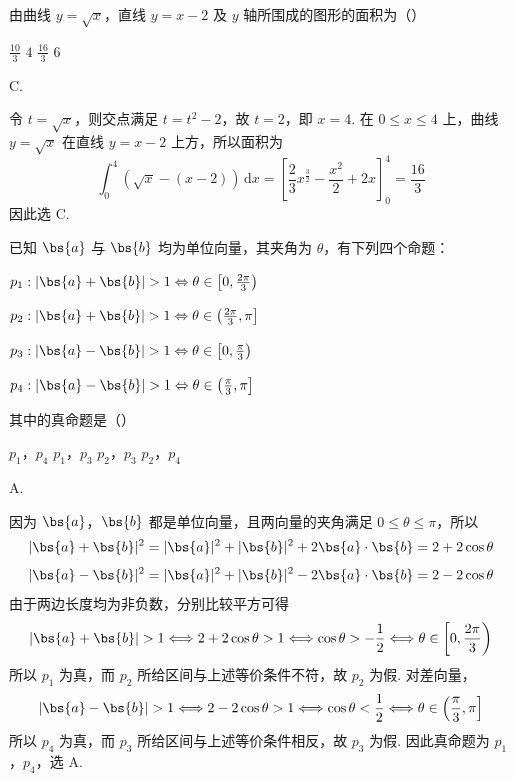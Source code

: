 \begin{problem}
由曲线 \(y = \sqrt{x}\)，直线 \(y = x - 2\) 及 \(y\) 轴所围成的图形的面积为（\quad）

\choices
    {\(\frac{10}{3}\)}
    {\(4\)}
    {\( \frac{16}{3} \)}
    {\(6\)}
\end{problem}

\begin{answer}
C.
\end{answer}

\begin{solution}
令 \(t=\sqrt{x}\)，则交点满足 \(t=t^{2}-2\)，故 \(t=2\)，即 \(x=4\). 在 \(0\leqslant x\leqslant4\) 上，曲线 \(y=\sqrt{x}\) 在直线 \(y=x-2\) 上方，所以面积为
\[
\int_{0}^{4}\left(\sqrt{x}-(x-2)\right)\,\mathrm{d}x
=\left[\frac23x^{\frac{3}{2}}-\frac{x^{2}}2+2x\right]_{0}^{4}
=\frac{16}{3}
\]
因此选 C.
\end{solution}

\begin{problem}
已知 \(\bs{a}\) 与 \(\bs{b}\) 均为单位向量，其夹角为 \(\theta\)，有下列四个命题：
\begin{circlelist}
    \item \(p_1: |\bs{a} + \bs{b}| > 1 \Leftrightarrow \theta \in \left[0, \frac{2\pi}{3}\right)\)
    \item \(p_2: |\bs{a} + \bs{b}| > 1 \Leftrightarrow \theta \in \left(\frac{2\pi}{3}, \pi\right]\)
    \item \(p_3: |\bs{a} - \bs{b}| > 1 \Leftrightarrow \theta \in \left[0, \frac{\pi}{3}\right)\)
    \item \(p_4: |\bs{a} - \bs{b}| > 1 \Leftrightarrow \theta \in \left(\frac{\pi}{3}, \pi\right]\)
\end{circlelist}
其中的真命题是（\quad）

\choices
    {\(p_1\)，\(p_4\)}
    {\(p_1\)，\(p_3\)}
    {\(p_2\)，\(p_3\)}
    {\(p_2\)，\(p_4\)}
\end{problem}

\begin{answer}
A.
\end{answer}

\begin{solution}
因为 \(\bs{a}\)，\(\bs{b}\) 都是单位向量，且两向量的夹角满足 \(0\leqslant\theta\leqslant\pi\)，所以
\[
|\bs{a}+\bs{b}|^{2}=|\bs{a}|^{2}+|\bs{b}|^{2}+2\bs{a}\cdot\bs{b}=2+2\cos\theta
\]
\[
|\bs{a}-\bs{b}|^{2}=|\bs{a}|^{2}+|\bs{b}|^{2}-2\bs{a}\cdot\bs{b}=2-2\cos\theta
\]
由于两边长度均为非负数，分别比较平方可得
\[
|\bs{a}+\bs{b}|>1\Longleftrightarrow 2+2\cos\theta>1
\Longleftrightarrow \cos\theta>-\frac12
\Longleftrightarrow \theta\in\left[0,\frac{2\pi}{3}\right)
\]
所以 \(p_{1}\) 为真，而 \(p_{2}\) 所给区间与上述等价条件不符，故 \(p_{2}\) 为假. 对差向量，
\[
|\bs{a}-\bs{b}|>1\Longleftrightarrow 2-2\cos\theta>1
\Longleftrightarrow \cos\theta<\frac12
\Longleftrightarrow \theta\in\left(\frac{\pi}{3},\pi\right]
\]
所以 \(p_{4}\) 为真，而 \(p_{3}\) 所给区间与上述等价条件相反，故 \(p_{3}\) 为假. 因此真命题为 \(p_{1}\)，\(p_{4}\)，选 A.
\end{solution}

